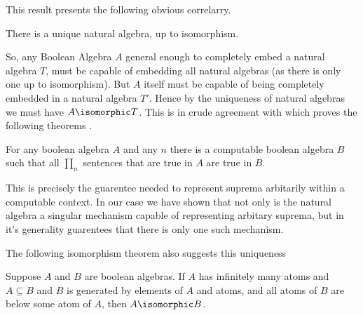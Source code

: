 \documentclass[12pt]{amsart}
\begin{document}
This result presents the following obvious correlarry.

\begin{cor}
There is a unique natural algebra, up to isomorphism.
\end{cor}

So, any Boolean Algebra $A$ general enough to completely embed a natural algebra $T$, must be capable of embedding all natural algebras (as there is only one up to isomorphism). But $A$ itself must be capable of being completely embedded in a natural algebra $T'$. Hence by the uniqueness of natural algebras we must have $A\isomorphic T$.
This is in crude agreement with \cite{HAH} which proves the following theorems \cite{HAH}.

\begin{lem}
For any boolean algebra $A$ and any $n$ there is a computable boolean algebra $B$ such that all $\prod_n$ sentences that are true in $A$ are true in $B$.
\end{lem}
This is precisely the guarentee needed to represent suprema arbitarily within a computable context. In our case we have shown that not only is the natural algebra a singular mechanism capable of representing arbitary suprema, but in it's generality guarentees that there is only one such mechanism.

The following isomorphism theorem also suggests this uniqueness \cite{HAH}

\begin{lem}
Suppose $A$ and $B$ are boolean algebras. If $A$ has infinitely many atoms and $A\subseteq B$ and $B$ is generated by elements of $A$ and atoms, and all atoms of $B$ are below some atom of $A$, then $A\isomorphic B$.
\end{lem}
\end{document}
